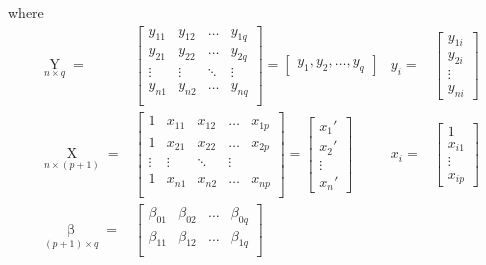     where 
\begin{subequations}\label{EqaSampleNotationOfMultiLinear}
    \begin{align}
        \mathop{Y}\limits_{n\times q} =&\begin{bmatrix}
        y_{11}&y_{12}&\ldots&y_{1q}\\
        y_{21}&y_{22}&\ldots&y_{2q}\\
        \vdots&\vdots&\ddots&\vdots\\
        y_{n1}&y_{n2}&\ldots&y_{nq}\\
        \end{bmatrix}
        =\begin{bmatrix}
            y_1,y_2,\ldots,y_q
        \end{bmatrix}
        &
        y _i=&\begin{bmatrix}
                y _{1i}\\
                y _{2i}\\
                \vdots\\
                y _{ni}
            \end{bmatrix}\\
        \mathop{X}\limits_{n\times (p+1)}=&\begin{bmatrix}
        1&x_{11}&x_{12}&\ldots&x_{1p}\\
        1&x_{21}&x_{22}&\ldots&x_{2p}\\
        \vdots&\vdots&\ddots&\vdots\\
        1&x_{n1}&x_{n2}&\ldots&x_{np}\\
        \end{bmatrix}
        =
        \begin{bmatrix}
        x_1'\\x_2'\\\vdots\\x_n'   
        \end{bmatrix} 
        &
        x_i=&\begin{bmatrix}
            1\\
            x_{i1}\\
            \vdots\\
            x_{ip}
        \end{bmatrix}\\
        \mathop{\beta }\limits_{(p+1)\times q}=&\begin{bmatrix}
        \beta _{01}&\beta _{02}&\ldots&\beta _{0q}\\
        \beta _{11}&\beta _{12}&\ldots&\beta _{1q}\\

\end{bmatrix}
\end{align}
\end{subequations}
